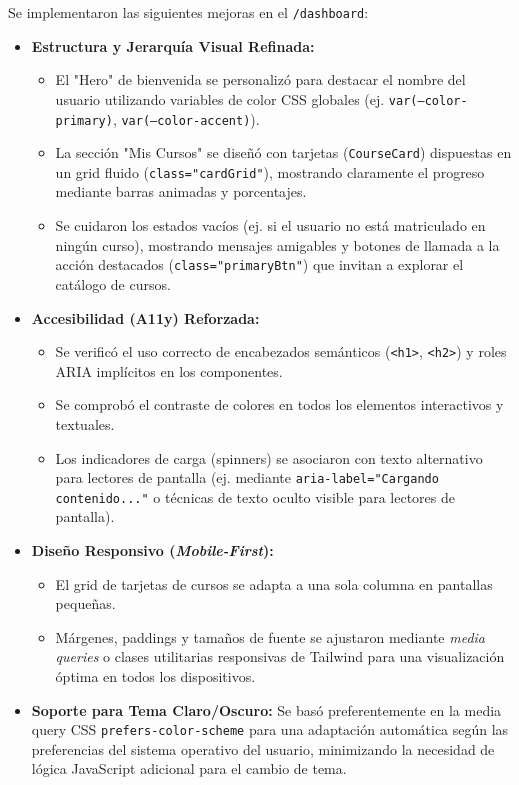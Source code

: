 Se implementaron las siguientes mejoras en el \texttt{/dashboard}:
\begin{itemize}[leftmargin=*]
  \item \textbf{Estructura y Jerarquía Visual Refinada:}
    \begin{itemize}
      \item El "Hero" de bienvenida se personalizó para destacar el nombre del usuario utilizando variables de color CSS globales (ej. \texttt{var(--color-primary)}, \texttt{var(--color-accent)}).
      \item La sección "Mis Cursos" se diseñó con tarjetas (\texttt{CourseCard}) dispuestas en un grid fluido (\texttt{class="cardGrid"}), mostrando claramente el progreso mediante barras animadas y porcentajes.
      \item Se cuidaron los estados vacíos (ej. si el usuario no está matriculado en ningún curso), mostrando mensajes amigables y botones de llamada a la acción destacados (\texttt{class="primaryBtn"}) que invitan a explorar el catálogo de cursos.
    \end{itemize}
  \item \textbf{Accesibilidad (A11y) Reforzada:}
    \begin{itemize}
      \item Se verificó el uso correcto de encabezados semánticos (\texttt{<h1>}, \texttt{<h2>}) y roles ARIA implícitos en los componentes.
      \item Se comprobó el contraste de colores en todos los elementos interactivos y textuales.
      \item Los indicadores de carga (spinners) se asociaron con texto alternativo para lectores de pantalla (ej. mediante \texttt{aria-label="Cargando contenido..."} o técnicas de texto oculto visible para lectores de pantalla).
    \end{itemize}
  \item \textbf{Diseño Responsivo (\emph{Mobile-First}):}
    \begin{itemize}
      \item El grid de tarjetas de cursos se adapta a una sola columna en pantallas pequeñas.
      \item Márgenes, paddings y tamaños de fuente se ajustaron mediante \emph{media queries} o clases utilitarias responsivas de Tailwind para una visualización óptima en todos los dispositivos.
    \end{itemize}
  \item \textbf{Soporte para Tema Claro/Oscuro:} Se basó preferentemente en la media query CSS \texttt{prefers-color-scheme} para una adaptación automática según las preferencias del sistema operativo del usuario, minimizando la necesidad de lógica JavaScript adicional para el cambio de tema.
\end{itemize}

